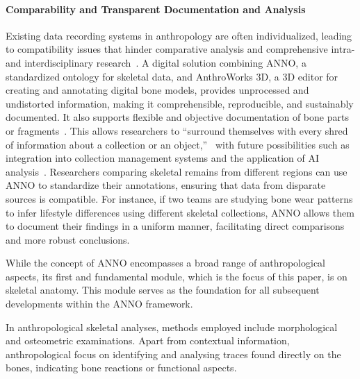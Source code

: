 \documentclass[sw]{iosart2x}
\begin{document}
\paragraph{Comparability and Transparent Documentation and Analysis}\label{sec:comp+transp} 
Existing data recording systems in anthropology are often individualized, leading to compatibility issues that hinder comparative analysis and comprehensive intra- and interdisciplinary research~\cite{HeuschkelSchmiedelLabudde2024}.
A digital solution combining ANNO, a standardized ontology for skeletal data, and AnthroWorks 3D, a 3D editor for creating and annotating digital bone models, provides unprocessed and undistorted information, making it comprehensible, reproducible, and sustainably documented.
It also supports flexible and objective documentation of bone parts or fragments~\cite{aw3dcidoc}.
This allows researchers to \enquote{surround themselves with every shred of information about a collection or an object,}~\cite[p.~148]{Palkovich.2001} with future possibilities such as integration into collection management systems and the application of AI analysis~\cite{HeuschkelSchmiedelLabudde2024}. 
Researchers comparing skeletal remains from different regions can use ANNO to standardize their annotations, ensuring that data from disparate sources is compatible.
For instance, if two teams are studying bone wear patterns to infer lifestyle differences using different skeletal collections, ANNO allows them to document their findings in a uniform manner, facilitating direct comparisons and more robust conclusions.

While the concept of ANNO encompasses a broad range of anthropological aspects, its first and fundamental module, which is the focus of this paper, is on skeletal anatomy.
This module serves as the foundation for all subsequent developments within the ANNO framework.

In anthropological skeletal analyses, methods employed include morphological and osteometric examinations.
Apart from contextual information, anthropological focus on identifying and analysing traces found directly on the bones, indicating bone reactions or functional aspects.
\end{document}
